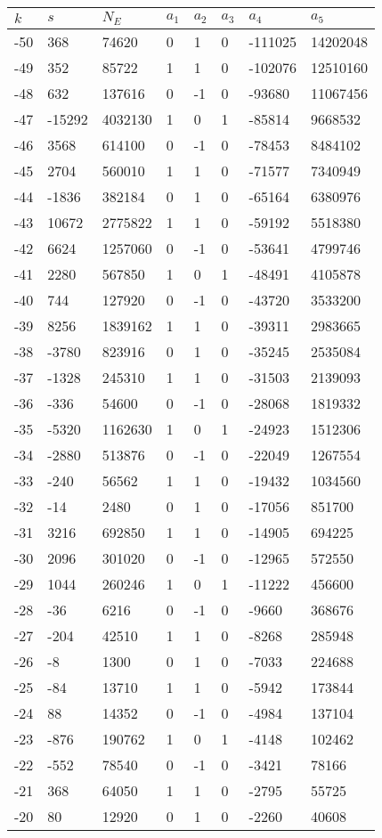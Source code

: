 \documentclass{amsart}
\begin{document}
\begin{longtable}{|l|l|l|lllll|}
\hline
$k$ & $s$ & $N_E$ & $a_1$ & $a_2$ & $a_3$ & $a_4$ & $a_5$\\
\hline
-50&368&74620&0&1&0&-111025&14202048\\
-49&352&85722&1&1&0&-102076&12510160\\
-48&632&137616&0&-1&0&-93680&11067456\\
-47&-15292&4032130&1&0&1&-85814&9668532\\
-46&3568&614100&0&-1&0&-78453&8484102\\
-45&2704&560010&1&1&0&-71577&7340949\\
-44&-1836&382184&0&1&0&-65164&6380976\\
-43&10672&2775822&1&1&0&-59192&5518380\\
-42&6624&1257060&0&-1&0&-53641&4799746\\
-41&2280&567850&1&0&1&-48491&4105878\\
-40&744&127920&0&-1&0&-43720&3533200\\
-39&8256&1839162&1&1&0&-39311&2983665\\
-38&-3780&823916&0&1&0&-35245&2535084\\
-37&-1328&245310&1&1&0&-31503&2139093\\
-36&-336&54600&0&-1&0&-28068&1819332\\
-35&-5320&1162630&1&0&1&-24923&1512306\\
-34&-2880&513876&0&-1&0&-22049&1267554\\
-33&-240&56562&1&1&0&-19432&1034560\\
-32&-14&2480&0&1&0&-17056&851700\\
-31&3216&692850&1&1&0&-14905&694225\\
-30&2096&301020&0&-1&0&-12965&572550\\
-29&1044&260246&1&0&1&-11222&456600\\
-28&-36&6216&0&-1&0&-9660&368676\\
-27&-204&42510&1&1&0&-8268&285948\\
-26&-8&1300&0&1&0&-7033&224688\\
-25&-84&13710&1&1&0&-5942&173844\\
-24&88&14352&0&-1&0&-4984&137104\\
-23&-876&190762&1&0&1&-4148&102462\\
-22&-552&78540&0&-1&0&-3421&78166\\
-21&368&64050&1&1&0&-2795&55725\\
-20&80&12920&0&1&0&-2260&40608\\

\end{longtable}
\end{document}
